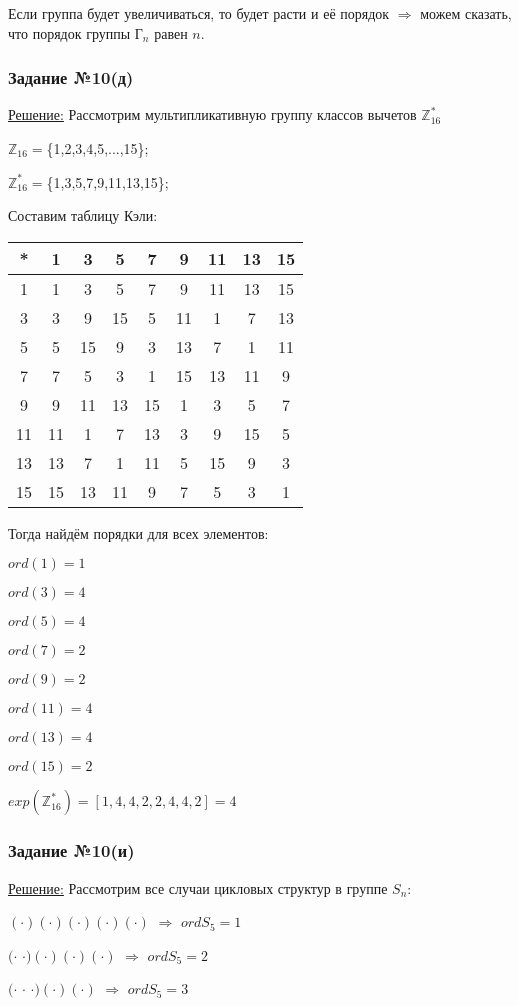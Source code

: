 \documentclass[utf8,14pt,a4paper,oneside,russian]{book}
\begin{document}
	Если группа будет увеличиваться, то будет расти и её порядок $\Rightarrow$ можем сказать, что порядок группы Г$_{n}$ равен $n$. 
	
	\subsubsection{Задание №10(д)}
	\underline{Решение:} Рассмотрим мультипликативную группу классов вычетов $\mathbb{Z}^*_{16}$
	
	$\mathbb{Z}_{16}=$\{1,2,3,4,5,...,15\};
	
	$\mathbb{Z}^*_{16}=$\{1,3,5,7,9,11,13,15\};
	
	Составим таблицу Кэли:
	
	\begin{longtable}{c|cccccccc}
		*&1&3&5&7&9&11&13&15\\\hline
		1&1&3&5&7&9&11&13&15\\
		3&3&9&15&5&11&1&7&13\\
		5&5&15&9&3&13&7&1&11\\
		7&7&5&3&1&15&13&11&9\\
		9&9&11&13&15&1&3&5&7\\
		11&11&1&7&13&3&9&15&5\\
		13&13&7&1&11&5&15&9&3\\
		15&15&13&11&9&7&5&3&1
	\end{longtable}
	
	Тогда найдём порядки для всех элементов:
	
	$ord(1)=1$
	
	$ord(3)=4$
	
	$ord(5)=4$
	
	$ord(7)=2$
	
	$ord(9)=2$
	
	$ord(11)=4$
	
	$ord(13)=4$
	
	$ord(15)=2$
	
	$exp(\mathbb{Z}^*_{16})=[1,4,4,2,2,4,4,2]=4$
	
	\subsubsection{Задание №10(и)}
	\underline{Решение:} Рассмотрим все случаи цикловых структур в группе $S_{n}$:
	
	$(\cdot)(\cdot)(\cdot)(\cdot)(\cdot)$ $\Rightarrow$ $ordS_{5}=1$
	
	$(\cdot$ $\cdot)(\cdot)(\cdot)(\cdot)$ $\Rightarrow$ $ordS_{5}=2$
	
	$(\cdot$ $\cdot$ $\cdot)(\cdot)(\cdot)$ $\Rightarrow$ $ordS_{5}=3$
	
\end{document}
